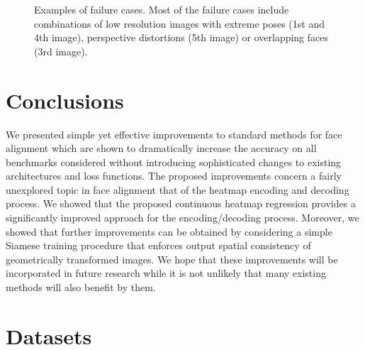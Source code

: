 \documentclass{bmvc2k}
\begin{document}
\begin{figure*}[htb!]
    \centering
    \begin{tcbraster}[raster columns=7, enhanced, blankest, raster row skip=1mm, raster column skip=1mm]
    \end{tcbraster}
    \caption{Examples of failure cases. Most of the failure cases include combinations of low resolution images with extreme poses (1st and 4th image), perspective distortions (5th image) or overlapping faces (3rd image). }\label{fig:examples-failure}
\end{figure*}

\section{Conclusions}
\vspace{-5px}
We presented simple yet effective improvements to standard methods for face alignment which are shown to dramatically increase the accuracy on all benchmarks considered without introducing sophisticated changes to existing architectures and loss functions. The proposed improvements concern a fairly unexplored topic in face alignment that of the heatmap encoding and decoding process. We showed that the proposed continuous heatmap regression provides a significantly improved approach for the encoding/decoding process. Moreover, we showed that further improvements can be obtained by considering a simple Siamese training procedure that enforces output spatial consistency of geometrically transformed images. We hope that these improvements will be incorporated in future research while it is not unlikely that many existing methods will also benefit by them.


\appendix

\section{Datasets}
\end{document}
